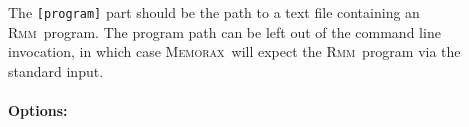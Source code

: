 \documentclass[a4paper]{article}
\newcommand{\memorax}{\textsc{Memorax}}
\newcommand{\rmm}{\textsc{Rmm}}
\begin{document}
The {\tt [program]} part should be the path to a text file containing
an \rmm\ program. The program path can be left out of the command line
invocation, in which case \memorax\ will expect the \rmm\ program via
the standard input.

\newcommand{\explainrff}{Converting an \rmm\ program to register free
  form, means to rewrite it such that the values of the registers are
  encoded in the control states, and all registers are replaced by the
  corresponding integer literals wherever they occur in
  instructions. This conversion is possible when all registers in the
  program have finite domains. Converting a program to register free
  form may be beneficial for analysis time, in particular when using
  the SB abstraction.}

\paragraph{Options:}
\end{document}

